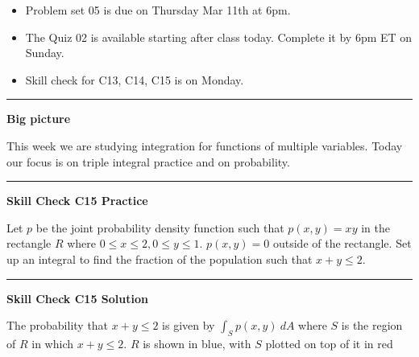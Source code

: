 \documentclass[12pt,letterpaper,noanswers]{exam}
\begin{document}
 \pdfpageheight 11in 
  \pdfpagewidth 8.5in





\begin{itemize}
\itemsep0em
    \item Problem set 05 is due on Thursday Mar 11th at 6pm.
    \item The Quiz 02 is available starting after class today.  Complete it by 6pm ET on Sunday.
    \item Skill check for C13, C14, C15 is on Monday.
\end{itemize}

\hrule
\vspace{0.2cm}


\noindent\textbf{Big picture}

This week we are studying integration for functions of multiple variables.  Today our focus is on triple integral practice and on probability.

\vspace{0.2cm}
\hrule
\vspace{0.2cm}

\noindent\textbf{Skill Check C15 Practice}
\begin{questions}
\question Let $p$ be the joint probability density function such that $p(x,y) = xy$ in the rectangle $R$ where $0\leq x \leq 2, 0\leq y\leq 1$.  $p(x,y) =0$ outside of the rectangle.  Set up an integral to find the fraction of the population such that $x+y \leq 2$.
\end{questions}


\vspace{0.2cm}
\hrule
\vspace{0.2cm}

\noindent\textbf{Skill Check C15 Solution}

The probability that $x+y \leq 2$ is given by $\int_S p(x,y)\ dA$ where $S$ is the region of $R$ in which $x+y\leq 2$.  $R$ is shown in blue, with $S$ plotted on top of it in red 
\end{document}
